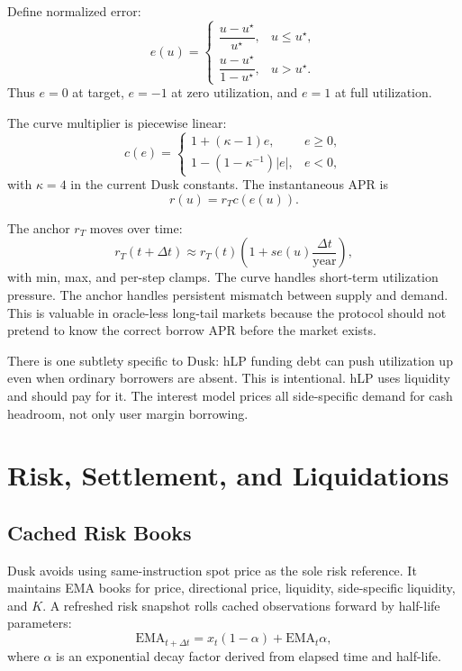 \documentclass[11pt]{article}
\newcommand{\ema}{\mathrm{EMA}}
\begin{document}
Define normalized error:
\begin{equation}
e(u)=
\begin{cases}
\dfrac{u-u^\star}{u^\star}, & u\le u^\star,\\[0.8em]
\dfrac{u-u^\star}{1-u^\star}, & u>u^\star.
\end{cases}
\end{equation}
Thus $e=0$ at target, $e=-1$ at zero utilization, and $e=1$ at full utilization.

The curve multiplier is piecewise linear:
\begin{equation}
c(e)=
\begin{cases}
1+(\kappa-1)e, & e\ge0,\\[0.6em]
1-\left(1-\kappa^{-1}\right)|e|, & e<0,
\end{cases}
\end{equation}
with $\kappa=4$ in the current Dusk constants. The instantaneous APR is
\begin{equation}
r(u)=r_T c(e(u)).
\end{equation}

The anchor $r_T$ moves over time:
\begin{equation}
r_T(t+\Delta t)\approx r_T(t)\left(1+s e(u)\frac{\Delta t}{\mathrm{year}}\right),
\end{equation}
with min, max, and per-step clamps. The curve handles short-term utilization pressure. The anchor handles persistent mismatch between supply and demand. This is valuable in oracle-less long-tail markets because the protocol should not pretend to know the correct borrow APR before the market exists.

There is one subtlety specific to Dusk: hLP funding debt can push utilization up even when ordinary borrowers are absent. This is intentional. hLP uses liquidity and should pay for it. The interest model prices all side-specific demand for cash headroom, not only user margin borrowing.

\section{Risk, Settlement, and Liquidations}

\subsection{Cached Risk Books}

Dusk avoids using same-instruction spot price as the sole risk reference. It maintains EMA books for price, directional price, liquidity, side-specific liquidity, and $K$. A refreshed risk snapshot rolls cached observations forward by half-life parameters:
\begin{equation}
\ema_{t+\Delta t}=x_t(1-\alpha)+\ema_t\alpha,
\end{equation}
where $\alpha$ is an exponential decay factor derived from elapsed time and half-life.
\end{document}
